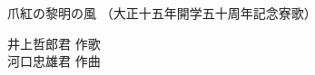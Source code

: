 \documentclass[10pt,b5j]{tarticle} %
\begin{document}
\begin{minipage}[c]{0.7\hsize} %
    \begin{center}
        {\LARGE
            爪紅の黎明の風 %
        }
        {\small 
            （大正十五年開学五十周年記念寮歌） %
        }
    \end{center}
\end{minipage}
\begin{minipage}[c]{0.3\hsize} %
    \begin{flushright} %
        井上哲郎君 作歌\\河口忠雄君 作曲 %
    \end{flushright}
\end{minipage}
\end{document}
